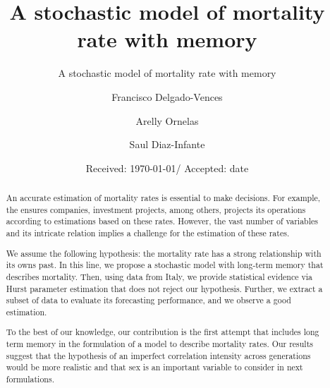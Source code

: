 \documentclass[smallextended]{svjour3}
\begin{document}
    \title{A stochastic model of mortality rate with memory}

    \subtitle{A stochastic model of mortality rate with memory}
    \author{Francisco Delgado-Vences 
        \and
        Arelly Ornelas
        \and
        Saul Diaz-Infante
    }
%
    \date{Received: \today / Accepted: date}
    \maketitle
%
\begin{abstract}
        An accurate estimation of mortality rates is essential to make
    decisions. For example, the ensures companies, investment projects, among
    others, projects its operations according to estimations  based on  these
    rates. However, the vast number of variables and its intricate relation
    implies a challenge for the estimation of these rates.

        We assume the following hypothesis: the mortality rate has a strong
    relationship with its owns past. In this line, we propose a stochastic
    model with long-term memory that describes mortality. Then, using data from
    Italy, we provide statistical evidence via Hurst parameter estimation that
    does not reject our hypothesis. Further, we extract a subset of data to
    evaluate its forecasting performance, and we observe a good estimation.

        To the best of our knowledge, our contribution is the first attempt
    that includes long term memory in the formulation of a model to
    describe mortality rates. Our results suggest that the hypothesis of an
    imperfect correlation intensity across generations would be more realistic
    and that sex is an important variable to consider in next formulations.
\end{abstract}
%
%
\end{document}

